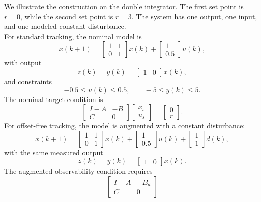We illustrate the construction on the double integrator. The first set point is \(r=0\),
while the second set point is \(r=3\). The system has one output, one input, and one modeled
constant disturbance.\\
For standard tracking, the nominal model is
\[
    x(k+1)
    =
    \begin{bmatrix}
        1 & 1\\
        0 & 1
    \end{bmatrix}x(k)
    +
    \begin{bmatrix}
        1\\
        0.5
    \end{bmatrix}u(k),
\]
with output
\[
    z(k)=y(k)=
    \begin{bmatrix}
        1 & 0
    \end{bmatrix}x(k),
\]
and constraints
\[
    -0.5\le u(k)\le 0.5,
    \qquad
    -5\le y(k)\le 5.
\]
The nominal target condition is
\[
    \begin{bmatrix}
        I-A & -B\\
        C   & 0
    \end{bmatrix}
    \begin{bmatrix}
        x_s\\ u_s
    \end{bmatrix}
    =
    \begin{bmatrix}
        0\\ r
    \end{bmatrix}.
\]
For offset-free tracking, the model is augmented with a constant disturbance:
\[
    x(k+1)
    =
    \begin{bmatrix}
        1 & 1\\
        0 & 1
    \end{bmatrix}x(k)
    +
    \begin{bmatrix}
        1\\
        0.5
    \end{bmatrix}u(k)
    +
    \begin{bmatrix}
        1\\
        1
    \end{bmatrix}d(k),
\]
with the same measured output
\[
    z(k)=y(k)=
    \begin{bmatrix}
        1 & 0
    \end{bmatrix}x(k).
\]
The augmented observability condition requires
\[
    \begin{bmatrix}
        I-A & -B_d\\
        C   & 0
    \end{bmatrix}
\]
